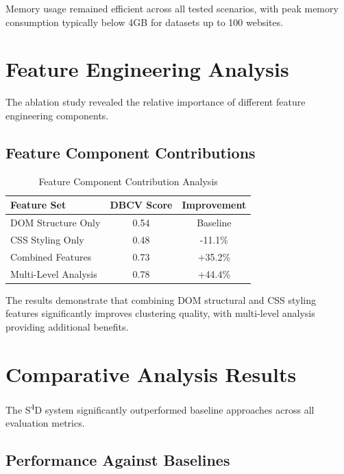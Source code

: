 Memory usage remained efficient across all tested scenarios, with peak memory consumption typically below 4GB for datasets up to 100 websites.

\section{Feature Engineering Analysis}
\label{sec:feature-analysis}

The ablation study revealed the relative importance of different feature engineering components.

\subsection{Feature Component Contributions}
\label{subsec:feature-contributions}

\begin{table}[h]
\centering
\caption{Feature Component Contribution Analysis}
\label{tab:feature-analysis}
\begin{tabular}{|l|c|c|}
\hline
\textbf{Feature Set} & \textbf{DBCV Score} & \textbf{Improvement} \\
\hline
DOM Structure Only & 0.54 & Baseline \\
CSS Styling Only & 0.48 & -11.1\% \\
Combined Features & 0.73 & +35.2\% \\
Multi-Level Analysis & 0.78 & +44.4\% \\
\hline
\end{tabular}
\end{table}

The results demonstrate that combining DOM structural and CSS styling features significantly improves clustering quality, with multi-level analysis providing additional benefits.

\section{Comparative Analysis Results}
\label{sec:comparative-results}

The S\textsuperscript{4}D system significantly outperformed baseline approaches across all evaluation metrics.

\subsection{Performance Against Baselines}
\label{subsec:baseline-performance}

